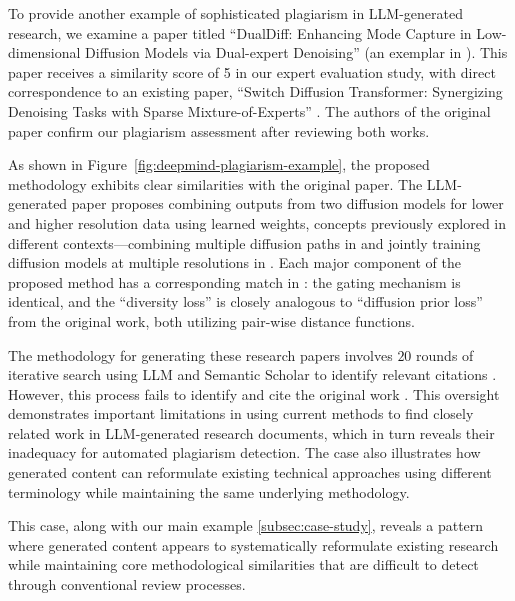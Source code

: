 To provide another example of sophisticated plagiarism in LLM-generated research, we examine a paper titled ``DualDiff: Enhancing Mode Capture in Low-dimensional Diffusion Models via Dual-expert Denoising'' (an exemplar in \citet{lu2024ai}). This paper receives a similarity score of 5 in our expert evaluation study, with direct correspondence to an existing paper, ``Switch Diffusion Transformer: Synergizing Denoising Tasks with Sparse Mixture-of-Experts'' \citep{park2025switch}. The authors of the original paper confirm our plagiarism assessment after reviewing both works.

As shown in Figure~\ref{fig:deepmind-plagiarism-example}, the proposed methodology exhibits clear similarities with the original paper. The LLM-generated paper proposes combining outputs from two diffusion models for lower and higher resolution data using learned weights, concepts previously explored in different contexts---combining multiple diffusion paths in \citet{park2025switch} and jointly training diffusion models at multiple resolutions in \citet{gu2023matryoshka}. Each major component of the proposed method has a corresponding match in \citet{park2025switch}: the gating mechanism is identical, and the ``diversity loss'' is closely analogous to ``diffusion prior loss'' from the original work, both utilizing pair-wise distance functions.

The methodology for generating these research papers involves $20$ rounds of iterative search using LLM and Semantic Scholar to identify relevant citations \citep{lu2024ai}. However, this process fails to identify and cite the original work \citep{park2025switch}. This oversight demonstrates important limitations in using current methods to find closely related work in LLM-generated research documents, which in turn reveals their inadequacy for automated plagiarism detection. The case also illustrates how generated content can reformulate existing technical approaches using different terminology while maintaining the same underlying methodology.

This case, along with our main example \ref{subsec:case-study}, reveals a pattern where generated content appears to systematically reformulate existing research while maintaining core methodological similarities that are difficult to detect through conventional review processes.


